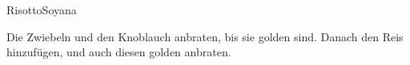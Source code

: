 
\begin{recipe}[]{Risotto}{Soyana}{}


\ingredient{}
\ingredient{}
\ingredient{}
\ingredient{}

\step
Die Zwiebeln und den Knoblauch anbraten, bis sie golden sind. Danach den Reis
hinzuf\"ugen, und auch diesen golden anbraten.


\end{recipe}
